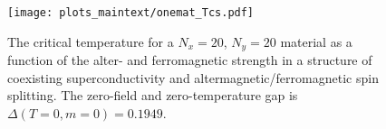 \documentclass[aps,twocolumn,amsmath,amssymb,preprintnumbers,floatfix,prl,superscriptaddress,longbibliography]{revtex4-2}%
\newcommand{\ve}[1]{\boldsymbol{#1}}
\newcommand{\vk}{{\ve{k}}} %
\newcommand{\hans}[1]{\textcolor{Magenta}{{#1}}}
\newcommand{\jacob}[1]{\textcolor{Red}{{#1}}}
\begin{document}
\begin{figure}[htb]
    \centering
    \texttt{[image: plots\_maintext/onemat\_Tcs.pdf]}
    \caption{
    The critical temperature for a $N_x = 20$, $N_y = 20$ material as a function of the alter- and ferromagnetic strength in a structure of coexisting superconductivity and altermagnetic/ferromagnetic spin splitting.
    The zero-field and zero-temperature gap is $\Delta(T=0, m = 0) = 0.1949$.}
    \label{fig:coex}
\end{figure}
\end{document}
